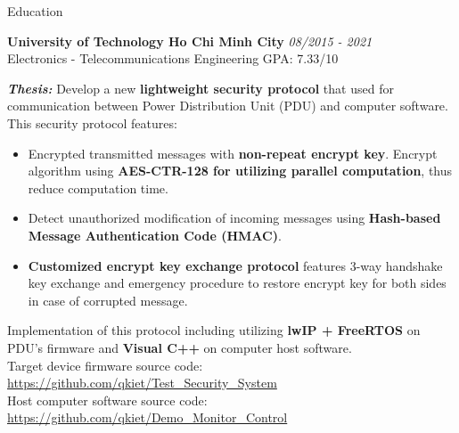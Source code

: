 \documentclass{resume} %
\begin{document}
\begin{rSection}{Education}

{\bf University of Technology Ho Chi Minh City} \hfill {\em 08/2015 - 2021}
\\ Electronics - Telecommunications Engineering\hfill { GPA: 7.33/10 }


\textbf{\textit{Thesis:}} Develop a new \textbf{lightweight security protocol} that used for communication between Power Distribution Unit (PDU) and computer software. This security protocol features:
\begin{itemize}
    \item Encrypted transmitted messages with \textbf{non-repeat encrypt key}. Encrypt algorithm using \textbf{AES-CTR-128 for utilizing parallel computation}, thus reduce computation time.
    \item Detect unauthorized modification of incoming messages using \textbf{Hash-based Message Authentication Code (HMAC)}.
    \item \textbf{Customized encrypt key exchange protocol} features 3-way handshake key exchange and emergency procedure to restore encrypt key for both sides in case of corrupted message.
\end{itemize}
Implementation of this protocol including utilizing \textbf{lwIP + FreeRTOS} on PDU's firmware and \textbf{Visual C++} on computer host software.\\
Target device firmware source code: \href{https://github.com/qkiet/Test_Security_System}{https://github.com/qkiet/Test\_Security\_System}\\
Host computer software source code:
\href{https://github.com/qkiet/Demo_Monitor_Control}{https://github.com/qkiet/Demo\_Monitor\_Control}\


\end{rSection}
\end{document}
